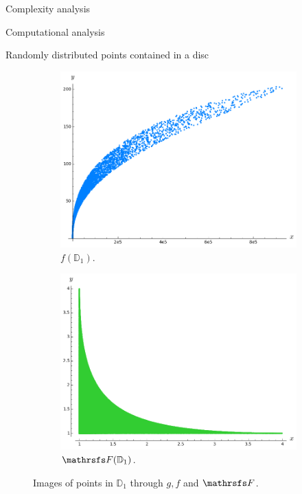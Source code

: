 \documentclass[11pt, a4paper, english, twoside, notitlepage, openright]{report}
\begin{document}
\begin{chapter}{Complexity analysis}
\begin{section}{Computational analysis}
\begin{subsection}{Randomly distributed points contained in a disc}
\begin{figure}[ht!]
\hspace{0.1cm}
\begin{subfigure}{.49\linewidth}\centering
\includegraphics[width=1\textwidth]{plots/ch5_37_disc2.png}
\vspace{-0.4cm}\caption{$f({\mathbb D}_1)$.\label{fig:disc2}}
\end{subfigure}
\begin{subfigure}{.49\linewidth}\centering
\includegraphics[width=1\textwidth]{plots/ch5_39_disc3.png}
\vspace{-0.4cm}\caption{$\FFF({\mathbb D}_1)$.\label{fig:disc3}}
\end{subfigure}
\vspace{-0.1cm}\caption{Images of points in ${\mathbb D}_{1}$ through $g, f$ and $\FFF$.\label{fig:discAll2}}
\end{figure}


\end{subsection}
\end{section}
\end{chapter}
\end{document}
